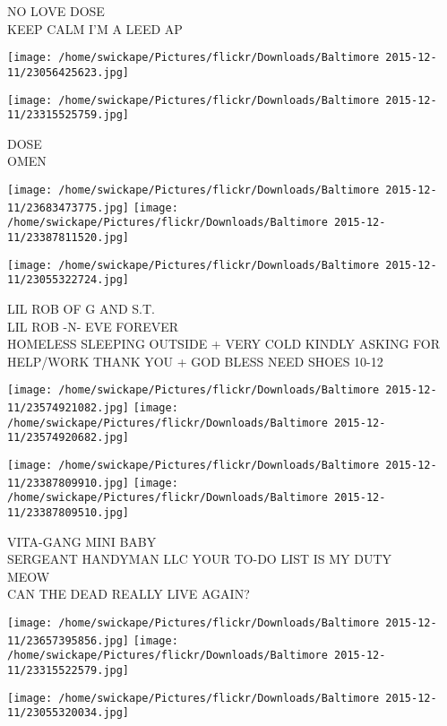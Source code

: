 \documentclass[10pt,letterpaper]{article}
\begin{document}
NO LOVE DOSE\\
KEEP CALM I'M A LEED AP
\pagebreak

\texttt{[image: /home/swickape/Pictures/flickr/Downloads/Baltimore 2015-12-11/23056425623.jpg]}

\vspace{0.25in}
\texttt{[image: /home/swickape/Pictures/flickr/Downloads/Baltimore 2015-12-11/23315525759.jpg]}

DOSE\\
OMEN
\pagebreak

\texttt{[image: /home/swickape/Pictures/flickr/Downloads/Baltimore 2015-12-11/23683473775.jpg]}
\texttt{[image: /home/swickape/Pictures/flickr/Downloads/Baltimore 2015-12-11/23387811520.jpg]}

\vspace{0.25in}
\texttt{[image: /home/swickape/Pictures/flickr/Downloads/Baltimore 2015-12-11/23055322724.jpg]}

LIL ROB OF G AND S.T.\\
LIL ROB {-}N{-} EVE FOREVER\\
HOMELESS SLEEPING OUTSIDE + VERY COLD KINDLY ASKING FOR HELP/WORK THANK YOU + GOD BLESS NEED SHOES 10{-}12
\pagebreak

\texttt{[image: /home/swickape/Pictures/flickr/Downloads/Baltimore 2015-12-11/23574921082.jpg]}
\texttt{[image: /home/swickape/Pictures/flickr/Downloads/Baltimore 2015-12-11/23574920682.jpg]}

\texttt{[image: /home/swickape/Pictures/flickr/Downloads/Baltimore 2015-12-11/23387809910.jpg]}
\texttt{[image: /home/swickape/Pictures/flickr/Downloads/Baltimore 2015-12-11/23387809510.jpg]}

VITA{-}GANG MINI BABY\\
SERGEANT HANDYMAN LLC YOUR TO{-}DO LIST IS MY DUTY\\
MEOW\\
CAN THE DEAD REALLY LIVE AGAIN?
\pagebreak

\texttt{[image: /home/swickape/Pictures/flickr/Downloads/Baltimore 2015-12-11/23657395856.jpg]}
\texttt{[image: /home/swickape/Pictures/flickr/Downloads/Baltimore 2015-12-11/23315522579.jpg]}

\vspace{0.25in}
\texttt{[image: /home/swickape/Pictures/flickr/Downloads/Baltimore 2015-12-11/23055320034.jpg]}
\end{document}
